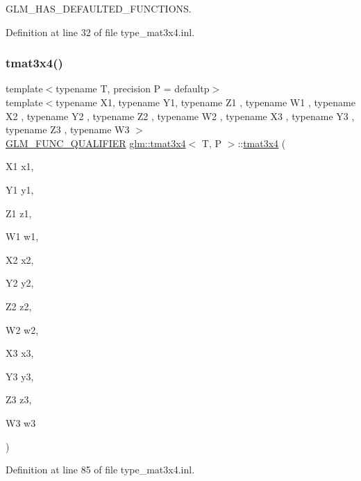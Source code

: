G\+L\+M\+\_\+\+H\+A\+S\+\_\+\+D\+E\+F\+A\+U\+L\+T\+E\+D\+\_\+\+F\+U\+N\+C\+T\+I\+O\+NS. 



Definition at line 32 of file type\+\_\+mat3x4.\+inl.

\mbox{\label{structglm_1_1tmat3x4_a98439a8c3c24d4185e3e96148d8fbee2}} 
\subsubsection{\texorpdfstring{tmat3x4()}{tmat3x4()}\hspace{0.1cm}{\footnotesize\ttfamily [20/22]}}
{\footnotesize\ttfamily template$<$typename T, precision P = defaultp$>$ \\
template$<$typename X1, typename Y1, typename Z1 , typename W1 , typename X2 , typename Y2 , typename Z2 , typename W2 , typename X3 , typename Y3 , typename Z3 , typename W3 $>$ \\
\mbox{\hyperlink{setup_8hpp_a33fdea6f91c5f834105f7415e2a64407}{G\+L\+M\+\_\+\+F\+U\+N\+C\+\_\+\+Q\+U\+A\+L\+I\+F\+I\+ER}} \mbox{\hyperlink{structglm_1_1tmat3x4}{glm\+::tmat3x4}}$<$ T, P $>$\+::\mbox{\hyperlink{structglm_1_1tmat3x4}{tmat3x4}} (\begin{DoxyParamCaption}\item[{X1}]{x1,  }\item[{Y1}]{y1,  }\item[{Z1}]{z1,  }\item[{W1}]{w1,  }\item[{X2}]{x2,  }\item[{Y2}]{y2,  }\item[{Z2}]{z2,  }\item[{W2}]{w2,  }\item[{X3}]{x3,  }\item[{Y3}]{y3,  }\item[{Z3}]{z3,  }\item[{W3}]{w3 }\end{DoxyParamCaption})}



Definition at line 85 of file type\+\_\+mat3x4.\+inl.

\mbox{\label{structglm_1_1tmat3x4_a9388a3a74c10e23d0fd00611b04d1fd0}} 
